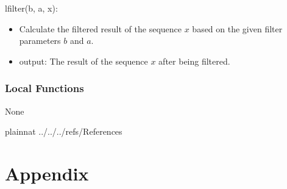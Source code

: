 \documentclass[12pt, titlepage]{article}
\begin{document}
\noindent lfilter(b, a, x):
\begin{itemize}
\item Calculate the filtered result of the sequence $x$ based on the given
filter parameters $b$ and $a$.
\item output: The result of the sequence $x$ after being filtered.
\end{itemize}

\subsubsection{Local Functions}

None

\newpage

 {plainnat}
 {../../../refs/References}

\newpage

\section{Appendix} \label{Appendix}

\end{document}
